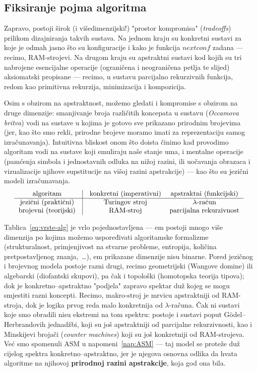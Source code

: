 \subsection{Fiksiranje pojma algoritma}

Zapravo, postoji širok (i višedimenzijski!) "prostor kompromisa" (\emph{tradeoffs}) prilikom dizajniranja takvih sustava. Na jednom kraju su konkretni sustavi za koje je odmah jasno što su konfiguracije i kako je funkcija $nextconf$ zadana --- recimo, RAM-strojevi. Na drugom kraju su apstraktni sustavi kod kojih su tri nabrojene esencijalne operacije (ograničena i neograničena petlja te slijed) aksiomatski propisane --- recimo, u sustavu parcijalno rekurzivnih funkcija, redom kao primitivna rekurzija, minimizacija i kompozicija.

Osim s obzirom na apstraktnost, možemo gledati i kompromise s obzirom na druge dimenzije: smanjivanje broja različitih koncepata u sustavu (\emph{Occamova britva}) vodi na sustave u kojima je gotovo sve prikazano prirodnim brojevima (jer, kao što smo rekli, prirodne brojeve moramo imati za reprezentaciju samog izračunavanja). Intuitivna bliskost onom što doista činimo kad provodimo algoritam vodi na sustave koji emuliraju naše stanje uma, i mentalne operacije (pamćenja simbola i jednostavnih odluka na nižoj razini, ili uočavanja obrazaca i vizualizacije njihove supstitucije na višoj razini apstrakcije) --- kao što su jezični modeli izračunavanja.
\begin{equation}\label{eq:vrste-alg}
    \begin{tabular}{c@{\quad}|@{\quad}cc}
        algoritam & konkretni (imperativni) & apstraktni (funkcijski)\\\hline
     jezični (praktični) & Turingov stroj & $\lambda$-račun\\
     brojevni (teorijski) & RAM-stroj & parcijalna rekurzivnost
    \end{tabular}
\end{equation}

Tablica~\eqref{eq:vrste-alg} je vrlo pojednostavljena --- em postoji mnogo više dimenzija po kojima možemo uspoređivati algoritamske formalizme (strukturalnost, primjenjivost na stvarne probleme, entropija, količina pretpostavljenog znanja,~\ldots), em prikazane dimenzije nisu binarne. Pored jezičnog i brojevnog modela postoje razni drugi, recimo geometrijski (Wangove domine) ili algebarski (diofantski skupovi), pa čak i topološki (homotopska teorija tipova); dok je konkretno--apstraktno "podjela" zapravo spektar duž kojeg se mogu smjestiti razni koncepti. Recimo, makro-stroj je mrvicu apstraktniji od RAM-stroja, dok je logika prvog reda malo konkretnija od $\lambda$-računa. Čak ni sustavi koje smo obradili nisu ekstremi na tom spektru: postoje i sustavi poput G\"odel--Herbrandovih jednadžbi, koji su još apstraktniji od parcijalne rekurzivnosti, kao i Minskijevi brojači (\emph{counter machines}) koji su još konkretniji od RAM-strojeva. Već smo spomenuli ASM u napomeni~\ref{nap:ASM} --- taj model se proteže duž cijelog spektra konkretno--apstraktno, jer je njegova osnovna odlika da hvata algoritme na njihovoj \textbf{prirodnoj razini apstrakcije}, koja god ona bila.

